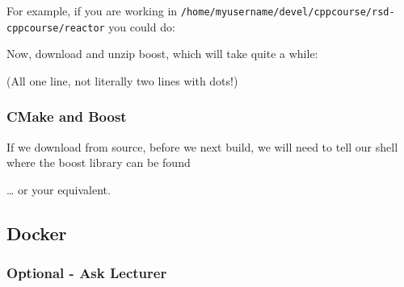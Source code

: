 For example, if you are working in
\texttt{/home/myusername/devel/cppcourse/rsd-cppcourse/reactor} you
could do:

\begin{Shaded}
\begin{Highlighting}[]
 
 
\end{Highlighting}
\end{Shaded}

Now, download and unzip boost, which will take quite a while:

\begin{Shaded}
\begin{Highlighting}[]
 
         \KeywordTok{>} 
 
\end{Highlighting}
\end{Shaded}

(All one line, not literally two lines with dots!)

\subsubsection{CMake and Boost}\label{cmake-and-boost}

If we download from source, before we next build, we will need to tell
our shell where the boost library can be found

\begin{Shaded}
\begin{Highlighting}[]
 
 
 
\end{Highlighting}
\end{Shaded}

\ldots{} or your equivalent.

\subsection{Docker}\label{docker}

\subsubsection{Optional - Ask Lecturer}\label{optional---ask-lecturer}

